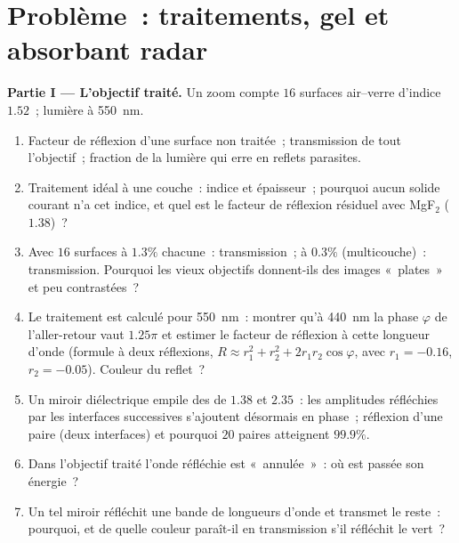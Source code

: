 \section{Problème~: traitements, gel et absorbant radar}

\begin{problem}
\label{pb:b2:wave-interfaces:1}

\medskip
\noindent\textbf{Partie I --- L'objectif traité.}
Un zoom compte $16$ surfaces air--verre d'indice $1.52$~; lumière à
\qty{550}{nm}.
\begin{enumerate}
  \item Facteur de réflexion d'une surface non traitée~; transmission de tout
        l'objectif~; fraction de la lumière qui erre en reflets parasites.
  \item Traitement idéal à une couche~: indice et épaisseur~; pourquoi aucun
        solide courant n'a cet indice, et quel est le
        facteur de réflexion résiduel avec MgF$_2$ ($1.38$)~?
  \item Avec $16$ surfaces à $1.3\%$ chacune~: transmission~; à $0.3\%$
        (multicouche)~: transmission. Pourquoi les vieux objectifs donnent-ils des images «~plates~»
        et peu contrastées~?
  \item Le traitement est calculé pour \qty{550}{nm}~: montrer qu'à
        \qty{440}{nm} la phase $\varphi$ de l'aller-retour vaut $1.25\pi$ et
        estimer le facteur de réflexion à cette longueur d'onde (formule à deux réflexions, $R
        \approx r_1^2 + r_2^2 + 2r_1r_2\cos\varphi$, avec $r_1 = -0.16$, $r_2 =
        -0.05$). Couleur du reflet~?
  \item Un miroir diélectrique empile des  de $1.38$ et
        $2.35$~: les amplitudes réfléchies par les interfaces successives
        s'ajoutent désormais en phase~; réflexion d'une paire (deux interfaces) et
        pourquoi $20$ paires atteignent $99.9\%$.
  \item Dans l'objectif traité l'onde réfléchie est «~annulée~»~: où
        est passée son énergie~?
  \item Un tel miroir réfléchit une bande de longueurs d'onde et transmet
        le reste~: pourquoi, et de quelle couleur paraît-il en transmission
        s'il réfléchit le vert~?
\end{enumerate}


\end{problem}
